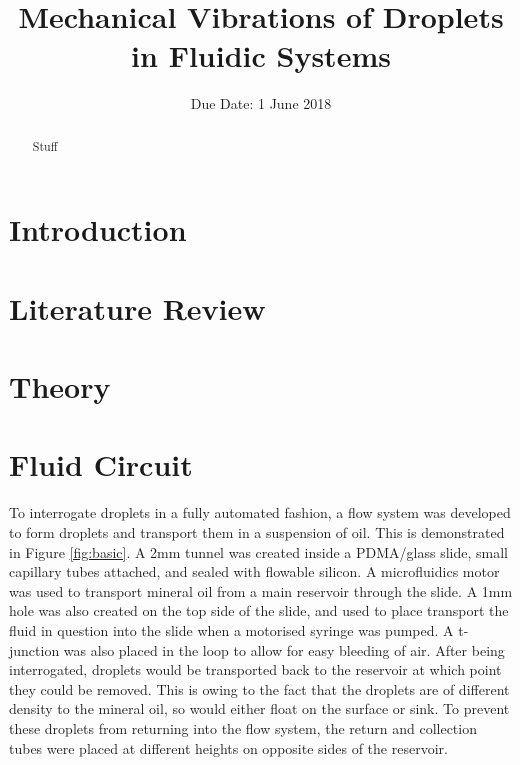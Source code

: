 \documentclass{physics_article_B}
\title{Mechanical Vibrations of Droplets in Fluidic Systems}
\date{Due Date: 1 June 2018}
\begin{document}
	
\setcounter{page}{0}
%

\begin{abstract}
	\large{Stuff
}
\end{abstract}
	

\tableofcontents

\setcounter{page}{1}
	
\newpage
{} 
\setcounter{page}{1}

\newpage

\section{Introduction\label{sect:intro}}

\section{Literature Review\label{sect:litrev}}

\section{Theory\label{sect:theory}}

\section{Fluid Circuit\label{sect_loop}}

To interrogate droplets in a fully automated fashion, a flow system was developed to form droplets and transport them in a suspension of oil. This is demonstrated in Figure \ref{fig:basic}. A 2mm tunnel was created inside a PDMA/glass slide, small capillary tubes attached, and sealed with flowable silicon. A microfluidics motor was used to transport mineral oil from a main reservoir through the slide. A 1mm hole was also created on the top side of the slide, and used to place transport the fluid in question into the slide when a motorised syringe was pumped. A t-junction was also placed in the loop to allow for easy bleeding of air. After being interrogated, droplets would be transported back to the reservoir at which point they could be removed. This is owing to the fact that the droplets are of different density to the mineral oil, so would either float on the surface or sink. To prevent these droplets from returning into the flow system, the return and collection tubes were placed at different heights on opposite sides of the reservoir. 
\end{document}
